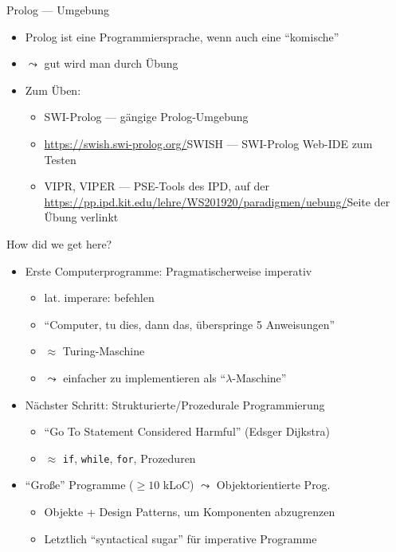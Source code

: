 \documentclass{beamer}
\begin{document}
\begin{frame}{Prolog --- Umgebung}
	\begin{itemize}
		\item Prolog ist eine Programmiersprache, wenn auch eine \enquote{komische}
		\item $\leadsto$ gut wird man durch Übung
		\item Zum Üben:
		\begin{itemize}
			\item SWI-Prolog --- gängige Prolog-Umgebung
			\item \url{https://swish.swi-prolog.org/}{SWISH} --- SWI-Prolog Web-IDE zum Testen
			\item VIPR, VIPER --- PSE-Tools des IPD, auf der \url{https://pp.ipd.kit.edu/lehre/WS201920/paradigmen/uebung/}{Seite der Übung} verlinkt
		\end{itemize}
	\end{itemize}
\end{frame}

\begin{frame}{How did we get here?}
	\begin{itemize}
		\item Erste Computerprogramme: Pragmatischerweise imperativ
		\begin{itemize}
			\item lat. imperare: befehlen
			\item \enquote{Computer, tu dies, dann das, überspringe 5 Anweisungen}
			\item $\approx$ Turing-Maschine
			\item $\leadsto$ einfacher zu implementieren als \enquote{$\lambda$-Maschine}
		\end{itemize}
		\item Nächster Schritt: Strukturierte/Prozedurale Programmierung
		\begin{itemize}
			\item \enquote{Go To Statement Considered Harmful} (Edsger Dijkstra)
			\item $\approx$ \texttt{if}, \texttt{while}, \texttt{for}, Prozeduren
		\end{itemize}
	\item \enquote{Große} Programme ($\geq 10$ kLoC) $\leadsto$ Objektorientierte Prog.
		\begin{itemize}
			\item Objekte + Design Patterns, um Komponenten abzugrenzen
			\item Letztlich \enquote{syntactical sugar} für imperative Programme
		\end{itemize}
	\end{itemize}
\end{frame}
\end{document}
